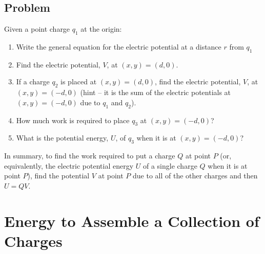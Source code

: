 \documentclass{article}
\begin{document}
\newpage

\subsection{Problem}

Given a point charge $q_1$ at the origin:

\begin{enumerate}

  \item Write the general equation for the electric potential at a distance $r$ from $q_1$

        \ifsolutions
        \else
        \vskip 36pt
        \fi

  \item Find the electric potential, $V$, at $(x,y) = (d,0)$.

        \ifsolutions
        \else
        \vskip 36pt
        \fi

  \item If a charge $q_2$ is placed at $(x,y) = (d,0)$, find the electric potential, $V$, at $(x,y) = (-d,0)$ (hint -- it is the sum of the electric potentials at $(x,y)=(-d, 0)$ due to $q_1$ and $q_2$).

        \ifsolutions
        \else
        \vskip 36pt
        \fi

  \item How much work is required to place $q_3$ at $(x,y) = (-d,0)$?

        \ifsolutions
        \else
        \vskip 36pt
        \fi

  \item What is the potential energy, $U$, of $q_3$ when it is at $(x,y) = (-d,0)$?

        \ifsolutions
        \else
        \vskip 36pt
        \fi

\end{enumerate}

In summary, to find the work required to put a charge $Q$ at point $P$ (or, equivalently, the electric potential energy $U$ of a single charge $Q$ when it is at point $P$), find the potential $V$ at point $P$ due to all of the other charges and then $U = QV$.

\newpage

\section{Energy to Assemble a Collection of Charges}
\end{document}
